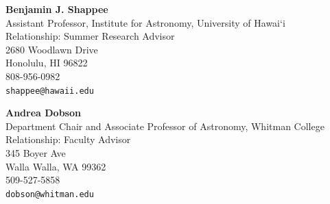 \documentclass[12pt]{article}
\begin{document}
\textbf{Benjamin J. Shappee} \\
Assistant Professor, Institute for Astronomy, University of Hawai`i \\
Relationship: Summer Research Advisor \\
2680 Woodlawn Drive \\
Honolulu, HI 96822 \\
808-956-0982 \\
\texttt{shappee@hawaii.edu}
\vspace{12pt}

\textbf{Andrea Dobson} \\
Department Chair and Associate Professor of Astronomy, Whitman College \\
Relationship: Faculty Advisor \\
345 Boyer Ave \\
Walla Walla, WA 99362 \\
509-527-5858 \\
\texttt{dobson@whitman.edu}
\vspace{12pt}

\end{document}
